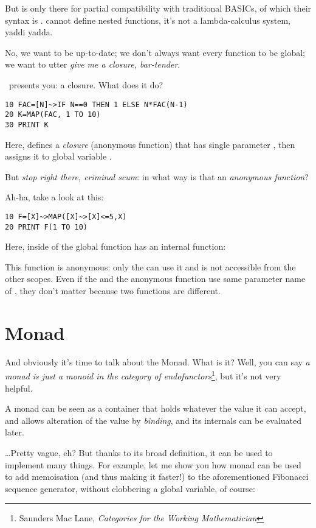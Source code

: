 But  is only there for partial compatibility with traditional BASICs, of which their syntax is .  cannot define nested functions, it's not a lambda-calculus system, yaddi yadda.

No, we want to be up-to-date; we don't always want every function to be global; we want to utter \emph{give me a closure, bar-tender}.

\tbas\ presents you: a closure. What does it do?

\begin{lstlisting}
10 FAC=[N]~>IF N==0 THEN 1 ELSE N*FAC(N-1)
20 K=MAP(FAC, 1 TO 10)
30 PRINT K
\end{lstlisting}

Here, \code{[N]\basicclosure\,\ldots} defines a \emph{closure} (anonymous function) that has single parameter , then assigns it to global variable .

But \emph{stop right there, criminal scum}: in what way is that an \emph{anonymous function}?

Ah-ha, take a look at this:

\begin{lstlisting}
10 F=[X]~>MAP([X]~>[X]<=5,X)
20 PRINT F(1 TO 10)
\end{lstlisting}

Here,  inside of the global function  has an internal function: 

This function is anonymous: only the  can use it and is not accessible from the other scopes. Even if the  and the anonymous function use same parameter name of , they don't matter because two functions are different.

\section{Monad}

And obviously it's time to talk about the Monad. What is it? Well, you can say \emph{a monad is just a monoid in the category of endofunctors}\footnote{Saunders Mac Lane, \emph{Categories for the Working Mathematician}}, but it's not very helpful.

A monad can be seen as a container that holds whatever the value it can accept, and allows alteration of the value by \emph{binding}, and its internals can be evaluated later.

\ldots Pretty vague, eh? But thanks to its broad definition, it can be used to implement many things. For example, let me show you how monad can be used to add memoisation (and thus making it faster!) to the aforementioned Fibonacci sequence generator, without clobbering a global variable, of course:


